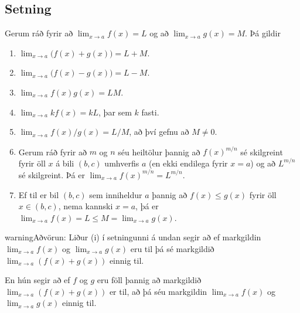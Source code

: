 \documentclass[b5paper,10pt,icelandic]{sphinxmanual}
\begin{document}
\subsection{Setning}
\label{\detokenize{kafli02:setning-markgildi}}\label{\detokenize{kafli02:id3}}
Gerum ráð fyrir að \(\lim_{x\rightarrow a}f(x)=L\) og að
\(\lim_{x\rightarrow a}g(x)=M\). Þá gildir
\begin{enumerate}
\item {} 
\(\lim_{x\rightarrow a}\Big(f(x)+g(x)\Big)=L+M\).

\item {} 
\(\lim_{x\rightarrow a}\Big(f(x)-g(x)\Big)=L-M\).

\item {} 
\(\lim_{x\rightarrow a}f(x)g(x)=LM\).

\item {} 
\(\lim_{x\rightarrow a}kf(x)=kL\), þar sem \(k\) fasti.

\item {} 
\(\lim_{x\rightarrow a}f(x)/g(x)=L/M\), að því gefnu að
\(M\neq 0\).

\item {} 
Gerum ráð fyrir að \(m\) og \(n\) séu heiltölur þannig að
\(f(x)^{m/n}\) sé skilgreint fyrir öll \(x\) á bili
\((b,c)\) umhverfis \(a\) (en ekki endilega fyrir
\(x=a\)) og að \(L^{m/n}\) sé skilgreint. Þá er
\(\lim_{x\rightarrow a}f(x)^{m/n}=L^{m/n}\).

\item {} 
Ef til er bil \((b,c)\) sem inniheldur \(a\) þannig að
\(f(x)\leq g(x)\) fyrir öll \(x\in (b,c)\), nema kannski
\(x=a\), þá er
\(\lim_{x\rightarrow a}f(x)=L\leq M=\lim_{x\rightarrow a}g(x)\).

\end{enumerate}

\begin{sphinxadmonition}{warning}{Aðvörun:}
Liður (i) í setningunni á undan segir að ef markgildin
\(\lim_{x\to a} f(x)\) og \(\lim_{x\to a} g(x)\) eru til þá sé
markgildið \(\lim_{x\to a} (f(x)+g(x))\) einnig til.

En hún segir  að ef \(f\) og \(g\) eru föll þannig að
markgildið \(\lim_{x\to a} (f(x)+g(x))\) er til, að þá séu
markgildin \(\lim_{x\to a} f(x)\) og \(\lim_{x\to a} g(x)\)
einnig til.
\end{sphinxadmonition}

\end{document}
